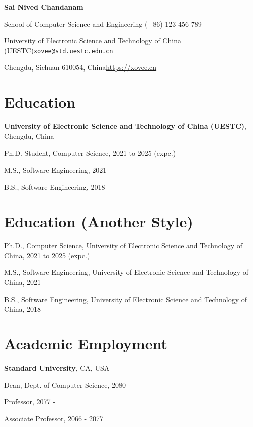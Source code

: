 \documentclass{article}
\newcommand{\cvsection}[1]{\section*{\rmfamily#1}}
\begin{document}
\begin{center}
    \Huge{
    \rmfamily
    \textbf{Sai Nived Chandanam}}
\end{center}
\vspace{20pt}


\setlength{\parskip}{1pt}
\renewcommand{\arraystretch}{1.25}


\noindent School of Computer Science and Engineering \hfill (+86) 123-456-789

\noindent University of Electronic Science and Technology of China (UESTC)\hfill \href{mailto:xovee@std.uestc.edu.cn}{\texttt{xovee@std.uestc.edu.cn}}

\noindent Chengdu, Sichuan 610054, China\hfill \url{https://xovee.cn}


\setlength{\parskip}{3pt}



\cvsection{Education}
\indent 

\textbf{University of Electronic Science and Technology of China (UESTC)}, Chengdu, China

\hspace{2em}Ph.D. Student, Computer Science, 2021 to 2025 (expc.)

\hspace{2em}M.S., Software Engineering, 2021

\hspace{2em}B.S., Software Engineering, 2018


\cvsection{Education (Another Style)}
\indent 

Ph.D., Computer Science, University of Electronic Science and Technology of China, 2021 to 2025 (expc.)

M.S., Software Engineering, University of Electronic Science and Technology of China, 2021

B.S., Software Engineering, University of Electronic Science and Technology of China, 2018


\cvsection{Academic Employment}
\indent

\textbf{Standard University}, CA, USA

\hspace{2em}Dean, Dept. of Computer Science, 2080 - 

\hspace{2em}Professor, 2077 - 

\hspace{2em}Associate Professor, 2066 - 2077
\end{document}
